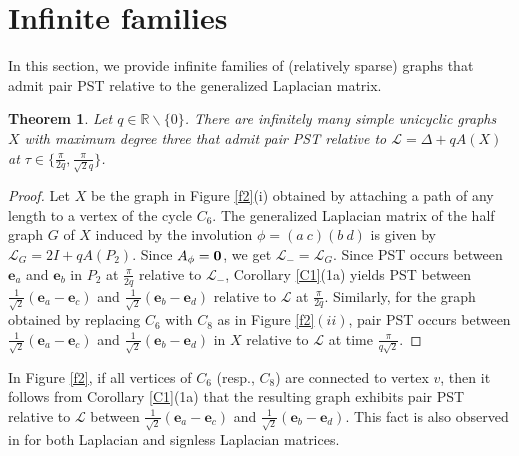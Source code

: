 \documentclass[12pt,a4paper]{article}
\newtheorem{thm}{Theorem}
\def \e {{\mathbf e}}
\def \o {{\bf 0}}
\newcommand{\ob}[1]{\left(#1\right)}
\begin{document}
\section{Infinite families}\label{sec:inf}

In this section, we provide infinite families of (relatively sparse) graphs that admit pair PST relative to the generalized Laplacian matrix.

\begin{thm}
Let $q\in\mathbb{R}\backslash\{0\}$.  There are infinitely many simple unicyclic graphs $X$ with maximum degree three that admit pair PST relative to $\mathscr{L}=\Delta+qA(X)$ at $\tau\in\{\frac{\pi}{2q},\frac{\pi}{\sqrt{2}q}\}$.
\end{thm}

\begin{proof}
Let $X$ be the graph in Figure \ref{f2}(i) obtained by attaching a path of any length to a vertex of the cycle $C_6$. The generalized Laplacian matrix of the half graph $G$ of $X$ induced by the involution $\phi=(a~c)(b~d)$ is given by $\mathscr{L}_G=2I+q A\ob{P_2}.$ Since $A_{\phi}=\o$, we get $\mathscr{L}_{-}=\mathscr{L}_G$. Since PST occurs between $\e_a$ and $\e_b$ in $P_2$ at $\frac{\pi}{2q}$ relative to $\mathscr{L}_{-}$, Corollary \ref{C1}(1a) yields PST between $\frac{1}{\sqrt{2}}\ob{\e_a-\e_c}$ and $\frac{1}{\sqrt{2}}\ob{\e_b-\e_d}$ relative to $\mathscr{L}$ at $\frac{\pi}{2q}$. Similarly, for the graph obtained by replacing $C_6$ with $C_8$ as in Figure \ref{f2}$(ii)$, pair PST occurs between $\frac{1}{\sqrt{2}}\left( \mathbf{e}_a - \mathbf{e}_c \right)$ and $\frac{1}{\sqrt{2}}\left( \mathbf{e}_b - \mathbf{e}_d \right)$ in $X$  relative to $\mathscr{L}$ at time $\frac{\pi}{q\sqrt{2}}$. 
\end{proof}

In Figure \ref{f2}, if all vertices of $C_6$ (resp., $C_8$) are connected to vertex $v$, then it follows from Corollary \ref{C1}(1a) that the resulting graph exhibits pair PST relative to $\mathscr{L}$ between $\frac{1}{\sqrt{2}}\left( \mathbf{e}_a - \mathbf{e}_c \right)$ and $\frac{1}{\sqrt{2}}\left( \mathbf{e}_b - \mathbf{e}_d \right)$. This fact is also observed in \cite[Theorem 1]{pal9} for both Laplacian and signless Laplacian matrices.
\end{document}
